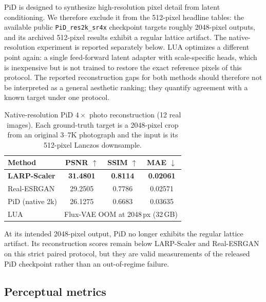 \documentclass[10pt]{article}
\newcommand{\method}{LARP-Scaler\xspace}
\begin{document}
PiD is designed to synthesize high-resolution pixel detail from latent
conditioning. We therefore exclude it from the 512-pixel headline tables: the
available public \texttt{PiD\_res2k\_sr4x} checkpoint targets roughly
2048-pixel outputs, and its archived 512-pixel results exhibit a regular
lattice artifact. The native-resolution experiment is reported
separately below.
LUA optimizes a different point again: a single feed-forward latent adapter
with scale-specific heads, which is inexpensive but is not trained to restore
the exact reference pixels of this protocol. The reported reconstruction gaps
for both methods should therefore not be interpreted as a general aesthetic
ranking; they quantify agreement with a known target under one protocol.

\begin{table}[H]
  \centering
  \caption{Native-resolution PiD $4\times$ photo reconstruction (12 real
  images). Each ground-truth target is a 2048-pixel crop from an original
  3--7K photograph and the input is its 512-pixel Lanczos downsample.}
  \label{tab:pid_native_quality}
  \small
  \begin{tabular}{lccc}
    \toprule
    Method & PSNR $\uparrow$ & SSIM $\uparrow$ & MAE $\downarrow$\\
    \midrule
    \textbf{\method} & \textbf{31.4801} & \textbf{0.8114} & \textbf{0.02061}\\
    Real-ESRGAN & 29.2505 & 0.7786 & 0.02571\\
    PiD (native 2k) & 26.1275 & 0.6683 & 0.03635\\
    LUA & \multicolumn{3}{c}{Flux-VAE OOM at 2048\,px (32\,GB)}\\
    \bottomrule
  \end{tabular}
\end{table}

At its intended 2048-pixel output, PiD no longer exhibits the regular lattice
artifact. Its reconstruction scores remain below \method and Real-ESRGAN on
this strict paired protocol, but they are valid measurements of the released
PiD checkpoint rather than an out-of-regime failure.

\subsection{Perceptual metrics}
\end{document}
